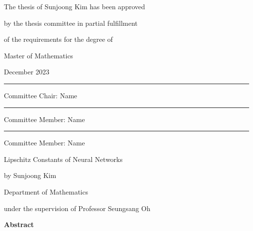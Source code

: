 \documentclass[11pt]{report}
\begin{document}
\newpage 
\begin{center}
\vspace{1cm}
{\fontsize{16pt}{18pt}\selectfont
The thesis of Sunjoong Kim has been approved \par
by the thesis committee in partial fulfillment\par
of the requirements for the degree of \par
Master of Mathematics \par}  
\vspace{1cm}
{\fontsize{14pt}{14pt}\selectfont December 2023} %
\par\vspace{3cm}
\rule{.6\textwidth}{0.4pt}\par %
{\fontsize{16pt}{16pt}\selectfont Committee Chair: Name \par} %
\vspace{1cm}
\rule{.6\textwidth}{0.4pt}\par %
{\fontsize{16pt}{16pt}\selectfont Committee Member: Name \par}
\vspace{1cm}
\rule{.6\textwidth}{0.4pt}\par %
{\fontsize{16pt}{16pt}\selectfont Committee Member: Name \par}
\end{center}

\newpage 
{} %
\begin{center}
\LARGE Lipschitz Constants of Neural Networks %
\par\vspace{20pt}

\normalsize \doublespacing
by Sunjoong Kim\par %
Department of Mathematics\par
under the supervision of Professor Seungsang Oh %
\par\vspace{20pt}
\large \textbf{Abstract}
\end{center}
\end{document}
